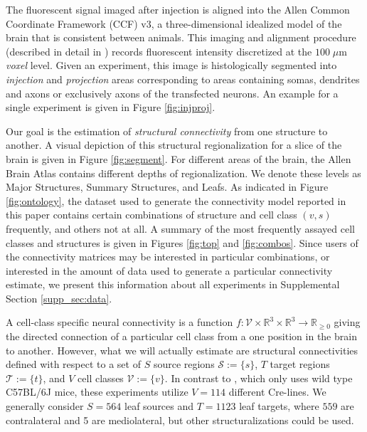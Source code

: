 The fluorescent signal imaged after injection is aligned into the Allen Common Coordinate Framework (CCF) v3, a three-dimensional idealized model of the brain that is consistent between animals.
This imaging and alignment procedure (described in detail in \citep{Harris2019-mr}) records fluorescent intensity discretized at the $100 \; \mu$m \textit{voxel} level. 
Given an experiment, this image is histologically segmented into \textit{injection} and \textit{projection} areas corresponding to areas containing somas, dendrites and axons or exclusively axons of the transfected neurons.
An example for a single experiment is given in Figure \ref{fig:injproj}.

Our goal is the estimation of \textit{structural connectivity} from one structure to another.
A visual depiction of this structural regionalization for a slice of the brain is given in Figure \ref{fig:segment}.
For different areas of the brain, the Allen Brain Atlas contains different depths of regionalization.
We denote these levels as Major Structures, Summary Structures, and Leafs.
As indicated in Figure \ref{fig:ontology}, the dataset used to generate the connectivity model reported in this paper contains certain combinations of structure and cell class $(v,s)$ frequently, and others not at all.
A summary of the most frequently assayed cell classes and structures is given in Figures \ref{fig:top} and \ref{fig:combos}.
Since users of the connectivity matrices may be interested in particular combinations, or interested in the amount of data used to generate a particular connectivity estimate, we present this information about all experiments in Supplemental Section \ref*{supp_sec:data}.

A cell-class specific neural connectivity is a function $f:  \mathcal V \times \mathbb R^3 \times \mathbb R^3 \to \mathbb R_{\geq 0}$ giving the directed connection of a particular cell class from a one position in the brain to another.
However, what we will actually estimate are structural connectivities defined with respect to a set of $S$ source regions $\mathcal S := \{ s\} $, $T$ target regions $\mathcal T := \{ t \}$, and $V$ cell classes $\mathcal V := \{v\}$.
In contrast to \citet{Knox2019-ot}, which only uses wild type C57BL/6J mice, these experiments utilize $V = 114$ different Cre-lines. 
We generally consider $S = 564$ leaf sources and $T = 1123$ leaf targets, where $559$ are contralateral and 5 are  mediolateral, but other structuralizations could be used.

